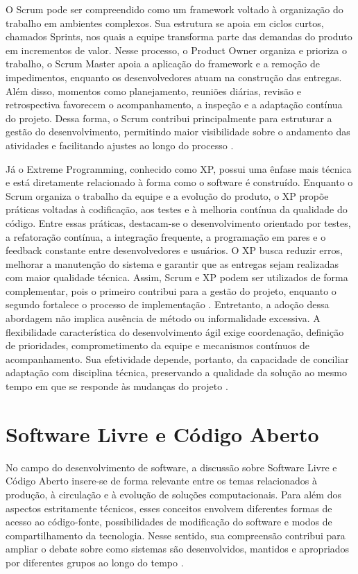 O Scrum pode ser compreendido como um framework voltado à organização do trabalho em ambientes complexos. Sua estrutura se apoia em ciclos curtos, chamados Sprints, nos quais a equipe transforma parte das demandas do produto em incrementos de valor. Nesse processo, o Product Owner organiza e prioriza o trabalho, o Scrum Master apoia a aplicação do framework e a remoção de impedimentos, enquanto os desenvolvedores atuam na construção das entregas. Além disso, momentos como planejamento, reuniões diárias, revisão e retrospectiva favorecem o acompanhamento, a inspeção e a adaptação contínua do projeto. Dessa forma, o Scrum contribui principalmente para estruturar a gestão do desenvolvimento, permitindo maior visibilidade sobre o andamento das atividades e facilitando ajustes ao longo do processo \cite{sommerville2016,kuhrmann2022}.

Já o Extreme Programming, conhecido como XP, possui uma ênfase mais técnica e está diretamente relacionado à forma como o software é construído. Enquanto o Scrum organiza o trabalho da equipe e a evolução do produto, o XP propõe práticas voltadas à codificação, aos testes e à melhoria contínua da qualidade do código. Entre essas práticas, destacam-se o desenvolvimento orientado por testes, a refatoração contínua, a integração frequente, a programação em pares e o feedback constante entre desenvolvedores e usuários. O XP busca reduzir erros, melhorar a manutenção do sistema e garantir que as entregas sejam realizadas com maior qualidade técnica. Assim, Scrum e XP podem ser utilizados de forma complementar, pois o primeiro contribui para a gestão do projeto, enquanto o segundo fortalece o processo de implementação \cite{sommerville2016,dyba2008}.
Entretanto, a adoção dessa abordagem não implica ausência de método ou informalidade excessiva. A flexibilidade característica do desenvolvimento ágil exige coordenação, definição de prioridades, comprometimento da equipe e mecanismos contínuos de acompanhamento. Sua efetividade depende, portanto, da capacidade de conciliar adaptação com disciplina técnica, preservando a qualidade da solução ao mesmo tempo em que se responde às mudanças do projeto \cite{agilemanifesto2001,dyba2008,kuhrmann2022}.

\section{Software Livre e Código Aberto}

No campo do desenvolvimento de software, a discussão sobre Software Livre e Código Aberto insere-se de forma relevante entre os temas relacionados à produção, à circulação e à evolução de soluções computacionais. Para além dos aspectos estritamente técnicos, esses conceitos envolvem diferentes formas de acesso ao código-fonte, possibilidades de modificação do software e modos de compartilhamento da tecnologia. Nesse sentido, sua compreensão contribui para ampliar o debate sobre como sistemas são desenvolvidos, mantidos e apropriados por diferentes grupos ao longo do tempo \cite{silveira2004,gnu2026,osi2026}.

